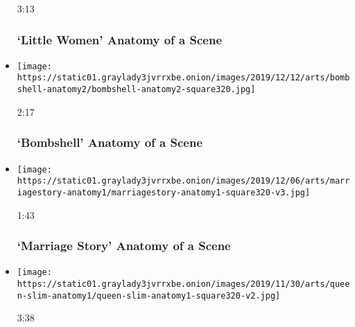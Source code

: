 \begin{itemize}
  3:13

  \hypertarget{little-women--anatomy-of-a-scene}{%
  \subsubsection{`Little Women' \textbar{} Anatomy of a
  Scene}\label{little-women--anatomy-of-a-scene}}
\item
  \href{https://www.nytimes3xbfgragh.onion/video/movies/100000006873220/bombshell-scene.html?action=click\&module=video-series-bar\&region=header\&pgtype=Article\&playlistId=video/anatomy-of-a-scene}{}

  \texttt{[image: https://static01.graylady3jvrrxbe.onion/images/2019/12/12/arts/bombshell-anatomy2/bombshell-anatomy2-square320.jpg]}

  2:17

  \hypertarget{bombshell--anatomy-of-a-scene}{%
  \subsubsection{`Bombshell' \textbar{} Anatomy of a
  Scene}\label{bombshell--anatomy-of-a-scene}}
\item
  \href{https://www.nytimes3xbfgragh.onion/video/movies/100000006863362/marriage-story-scene.html?action=click\&module=video-series-bar\&region=header\&pgtype=Article\&playlistId=video/anatomy-of-a-scene}{}

  \texttt{[image: https://static01.graylady3jvrrxbe.onion/images/2019/12/06/arts/marriagestory-anatomy1/marriagestory-anatomy1-square320-v3.jpg]}

  1:43

  \hypertarget{marriage-story--anatomy-of-a-scene}{%
  \subsubsection{`Marriage Story' \textbar{} Anatomy of a
  Scene}\label{marriage-story--anatomy-of-a-scene}}
\item
  \href{https://www.nytimes3xbfgragh.onion/video/movies/100000006850892/queen-and-slim-scene.html?action=click\&module=video-series-bar\&region=header\&pgtype=Article\&playlistId=video/anatomy-of-a-scene}{}

  \texttt{[image: https://static01.graylady3jvrrxbe.onion/images/2019/11/30/arts/queen-slim-anatomy1/queen-slim-anatomy1-square320-v2.jpg]}

  3:38

  \hypertarget{queen--slim--anatomy-of-a-scene}{%
}
\end{itemize}

